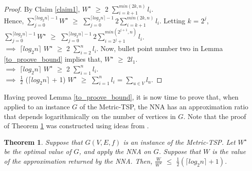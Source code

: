 \documentclass[12pt]{article}
\newtheorem{theorem}[definition]{Theorem}
\numberwithin{equation}{subsection}
\numberwithin{table}{subsection}
\numberwithin{algorithm}{subsection}
\begin{document}
\begin{proof}
By Claim \ref{claim1},  $W^\star$  $\geq$ 2 $\sum_{i = k + 1}^{min(2k, n)} l_i$. \\Hence,  $\sum_{j = 0}^{\lceil log_2 n \rceil - 1} W^\star$  $\geq$ $\sum_{j = 0}^{\lceil log_2 n \rceil -1} 2 \sum_{i = k + 1}^{min(2k, n)} l_i$. Letting $k$ = $2^{j}$,\\$\sum_{j = 0}^{\lceil log_2 n \rceil - 1} W^\star$  $\geq$ $\sum_{j = 0}^{\lceil log_2 n \rceil -1} 2 \sum_{i = 2^j + 1}^{min(2^{j+1}, n)} l_i$. \\$\implies$ $\lceil log_2 n \rceil$ $W^\star$  $\geq$ 2 $\sum_{i = 2}^{n} l_i$. Now, bullet point number two in Lemma \ref{to_proove_bound} implies that, $W^\star$ $\geq$ 2$l_1$. \\$\implies$ $\lceil log_2 n \rceil$ $W^\star$  $\geq$ 2 $\sum_{i = 1}^{n} l_i$.\\$\implies$  $\frac{1}{2}$ ($\lceil log_2 n \rceil$ + 1) $W^\star$  $\geq$ $\sum_{i = 1}^{n} l_i$ = $\sum_{u \in V} l_u$.
\end{proof}
Having proved Lemma \ref{to_proove_bound}, it is now time to prove that, when applied to an instance $G$ of the Metric-TSP, the NNA has an approximation ratio that depends logarithmically on the number of vertices in $G$. Note that the proof of Theorem \ref{log_bound_thrm} was constructed using ideas from \cite{Rosenkrantz}.
\begin{theorem}
\label{log_bound_thrm}
Suppose that $G(V,E,f)$ is an instance of the Metric-TSP. Let $W^\star$ be the optimal value of $G$, and apply the NNA on $G$. Suppose that $W$ is the value of the approximation returned by the NNA. Then, $\frac{W}{W^\star}$ $\leq$ $\frac{1}{2}(\lceil log_2 n \rceil + 1)$. {\normalfont\cite{Rosenkrantz}}
\end{theorem}
\end{document}
